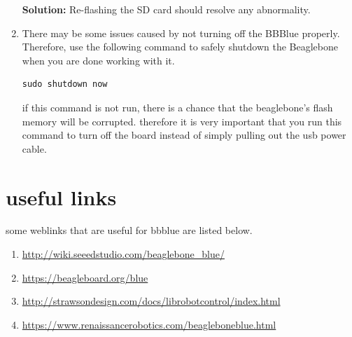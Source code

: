 \begin{enumerate}[\emph{T\#}1:]
    \textbf{Solution:}  Re-flashing the SD card should resolve any abnormality.

    
  \item There may be some issues caused by not turning off the BBBlue properly. Therefore, use the following command to safely shutdown the Beaglebone when you are done working with it.

\begin{verbatim}
sudo shutdown now
\end{verbatim}
    if this command is not run, there is a chance that the beaglebone's flash memory will be corrupted. therefore it is very important that you run this command to turn off the board instead of simply pulling out the usb power cable.

\end{enumerate}

\section{useful links}
\label{sec:useful-links}

some weblinks that are useful for bbblue are listed below. 

\begin{enumerate}
\item \href{http://wiki.seeedstudio.com/beaglebone_blue/}{http://wiki.seeedstudio.com/beaglebone\_blue/}
  
\item \href{https://beagleboard.org/blue}{https://beagleboard.org/blue}
  
\item \href{http://strawsondesign.com/docs/librobotcontrol/index.html}{http://strawsondesign.com/docs/librobotcontrol/index.html}
  
\item \href{https://www.renaissancerobotics.com/beagleboneblue.html}{https://www.renaissancerobotics.com/beagleboneblue.html}
\end{enumerate}



